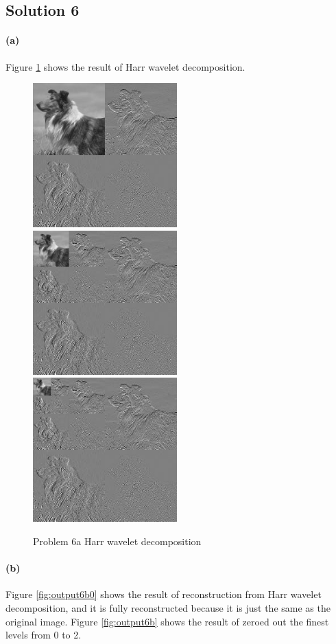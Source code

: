 \documentclass{article}
\newcommand{\solution}[1]{\clearpage \subsection*{Solution #1}}
\newcommand{\spart}[1]{\paragraph{(#1)}}
\begin{document}
\solution{6} 
\spart{a} Figure \ref{fig:output6a} shows the result of Harr wavelet decomposition.
\begin{figure}[!h]
  \centering
    \includegraphics[height=15em]{code/outputs/prob6a_1.jpg}
    \includegraphics[height=15em]{code/outputs/prob6a_2.jpg}
    \includegraphics[height=15em]{code/outputs/prob6a_3.jpg}
  \caption{Problem 6a Harr wavelet decomposition}
  \label{fig:output6a}
\end{figure}

\spart{b} Figure \ref{fig:output6b0} shows the result of reconstruction from Harr wavelet decomposition, and it is fully reconstructed because it is just the same as the original image. Figure \ref{fig:output6b} shows the result of zeroed out the finest levels from 0 to 2.
\end{document}
